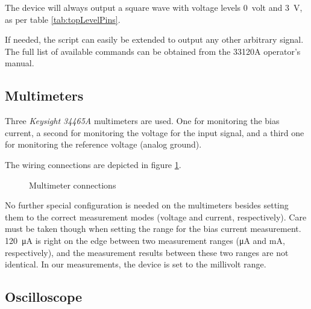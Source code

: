 The  device  will always output a square wave  with voltage levels
\SI{0}{volt} and \SI{3}{\volt}, as per table \ref{tab:topLevelPins}.

If needed,  the script can  easily be extended  to output any  other arbitrary
signal. The full  list of available commands  can be obtained from  the 33120A
operator's manual.



\subsection{Multimeters}
\label{subsec:34465A}

Three \emph{Keysight 34465A} multimeters are used. One for monitoring the bias
current, a second for monitoring the voltage for the input signal, and a third
one for monitoring the reference voltage (analog ground).

The wiring connections are depicted in figure \ref{fig:multimeterConnections}.

\begin{figure}
    \centering
    \caption{Multimeter connections}
    \label{fig:multimeterConnections}
\end{figure}

No  further  special  configuration  is  needed  on  the  multimeters  besides
setting  them  to   the  correct  measurement  modes   (voltage  and  current,
respectively). Care must be  taken though when setting the range  for the bias
current measurement. \SI{120}{\micro\ampere} is right  on the edge between two
measurement ranges (\si{\micro\ampere}  and \si{\milli\ampere}, respectively),
and the measurement results between these two ranges are not identical. In our
measurements, the device is set to the millivolt range.



\subsection{Oscilloscope}
\label{subsec:oscilloscope}

